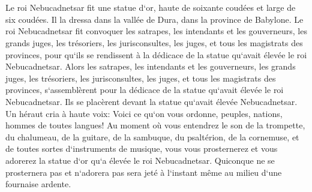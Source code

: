 \chapter{}

\verse Le roi Nebucadnetsar fit une statue d`or, haute de soixante coudées et large de six coudées. Il la dressa dans la vallée de Dura, dans la province de Babylone. 
\verse Le roi Nebucadnetsar fit convoquer les satrapes, les intendants et les gouverneurs, les grands juges, les trésoriers, les jurisconsultes, les juges, et tous les magistrats des provinces, pour qu`ils se rendissent à la dédicace de la statue qu`avait élevée le roi Nebucadnetsar. 
\verse Alors les satrapes, les intendants et les gouverneurs, les grands juges, les trésoriers, les jurisconsultes, les juges, et tous les magistrats des provinces, s`assemblèrent pour la dédicace de la statue qu`avait élevée le roi Nebucadnetsar. Ils se placèrent devant la statue qu`avait élevée Nebucadnetsar. 
\verse Un héraut cria à haute voix: Voici ce qu`on vous ordonne, peuples, nations, hommes de toutes langues! 
\verse Au moment où vous entendrez le son de la trompette, du chalumeau, de la guitare, de la sambuque, du psaltérion, de la cornemuse, et de toutes sortes d`instruments de musique, vous vous prosternerez et vous adorerez la statue d`or qu`a élevée le roi Nebucadnetsar. 
\verse Quiconque ne se prosternera pas et n`adorera pas sera jeté à l`instant même au milieu d`une fournaise ardente. 
